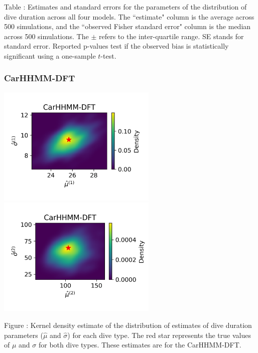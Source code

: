 \documentclass{article}
\begin{document}
        \noindent Table : Estimates and standard errors for the parameters of the distribution of dive duration across all four models. The ``estimate" column is the average across 500 simulations, and the ``observed Fisher standard error" column is the median across 500 simulations. The $\pm$ refers to the inter-quartile range. SE stands for standard error. Reported p-values test if the observed bias is statistically significant using a one-sample $t$-test.
        \addtocounter{tablenum}{1}
        
        \subsubsection{CarHHMM-DFT}
        \begin{center}
        \includegraphics[width=3in]{../Plots/hhmm_FV_MLE_density_dive_duration_-1_0.png}
        \includegraphics[width=3in]{../Plots/hhmm_FV_MLE_density_dive_duration_-1_1.png}
        \end{center}
        
        \noindent Figure : Kernel density estimate of the distribution of estimates of dive duration parameters ($\hat \mu$ and $\hat \sigma$) for each dive type. The red star represents the true values of $\mu$ and $\sigma$ for both dive types. These estimates are for the CarHHMM-DFT.
        \addtocounter{fignum}{1}
        
\end{document}
